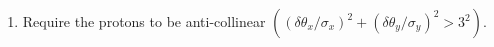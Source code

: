 \begin{enumerate}
	\item Require the protons to be anti-collinear $\left(\left(\delta\theta_x/\sigma_x\right)^2+\left(\delta\theta_y/\sigma_y\right)^2>3^2\right)$. 
\begin{figure}[H]
	\centering
	\parbox{0.48\textwidth}{
		\centering
		\begin{subfigure}[b]{\linewidth}{
				}
		\end{subfigure}
	}
	\quad
	\parbox{0.48\textwidth}{
		\centering
		\begin{subfigure}[b]{\linewidth}{
				}

\end{subfigure}}
\end{figure}
\end{enumerate}
